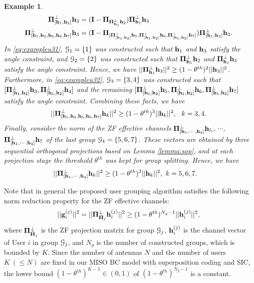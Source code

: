 \documentclass[11pt, draft, onecolumn ]{IEEEtran}
\newtheorem{example}{Example}
\begin{document}
\begin{example}
\begin{align}
{\bf \Pi}_{[{\bf h}_1,{\bf h}_2]}^\perp{\bf h}_3&=  ({\bf I} - {\bf \Pi}_{{\bf \Pi}^\perp_{{\bf h}_1}{\bf h}_2}) {\bf \Pi}_{{\bf h}_1}^\perp {\bf h}_3  \label{eq:exampleu31}\\
{\bf \Pi}_{[{\bf h}_1,{\bf h}_2,{\bf h}_5,{\bf h}_6,{\bf h}_7]}^\perp{\bf h}_3 &= ({\bf I} - {\bf \Pi}_{[{\bf \Pi}_{[{\bf h}_1,{\bf h}_2]}^\perp{\bf h}_5,{\bf \Pi}_{[{\bf h}_1,{\bf h}_2]}^\perp{\bf h}_6,{\bf \Pi}_{[{\bf h}_1,{\bf h}_2]}^\perp{\bf h}_7]}) {\bf \Pi}_{[{\bf h}_1,{\bf h}_2]}^\perp{\bf h}_3. \label{eq:exampleu32}
\end{align}
In \eqref{eq:exampleu31}, ${\cal G}_1=\{1\}$ was constructed such that ${\bf h}_1$ and ${\bf h}_3$ satisfy the angle constraint, and ${\cal G}_2=\{2\}$ was constructed such that  ${\bf \Pi}^\perp_{{\bf h}_1}{\bf h}_2$ and  ${\bf \Pi}_{{\bf h}_1}^\perp {\bf h}_3$ satisfy the angle constraint. Hence,   we have $||{\bf \Pi}_{{\bf h}_1}^\perp {\bf h}_3||^2 \ge (1-\theta^{th})^2 ||{\bf h}_3||^2$. Furthermore, in \eqref{eq:exampleu32}, ${\cal G}_3=\{3,4\}$ was constructed such that
$[{\bf \Pi}_{[{\bf h}_1,{\bf h}_2]}^\perp{\bf h}_3,{\bf \Pi}_{[{\bf h}_1,{\bf h}_2]}^\perp{\bf h}_4]$ and the remaining $[{\bf \Pi}_{[{\bf h}_1,{\bf h}_2]}^\perp{\bf h}_5,{\bf \Pi}_{[{\bf h}_1,{\bf h}_2]}^\perp{\bf h}_6,{\bf \Pi}_{[{\bf h}_1,{\bf h}_2]}^\perp{\bf h}_7]$ satisfy the angle constraint. Combining these facts, we have
\begin{equation}
||{\bf \Pi}_{[{\bf h}_1,{\bf h}_2,{\bf h}_5,{\bf h}_6,{\bf h}_7]}^\perp{\bf h}_k||^2 \ge (1-\theta^{th})^3||{\bf h}_k||^2, ~~k=3,4.
\end{equation}
Finally, consider the norm of the ZF effective channels ${\bf \Pi}_{[{\bf h}_1,\cdots,{\bf h}_4]}^\perp {\bf h}_5$, $\cdots$, ${\bf \Pi}_{[{\bf h}_1,\cdots,{\bf h}_4]}^\perp {\bf h}_7$ of the last group ${\cal G}_4=\{5,6,7\}$. These vectors are obtained by three sequential orthogonal projections based on Lemma  \ref{lemma:sop}, and at each projection stage the threshold $\theta^{th}$ was kept for group splitting. Hence, we have
\begin{align*}
||{\bf \Pi}_{[{\bf h}_1,\cdots,{\bf h}_4]}^\perp {\bf h}_k||^2 &\ge(1- \theta^{th})^3||{\bf h}_k||^2, ~k=5,6,7.
\end{align*}
\end{example}
Note that in general the proposed user grouping algorithm satisfies the following norm reduction property for the ZF effective channels:
\begin{equation}
||{\bf g}_i^{(j)}||^2=||{\bf \Pi}_{\tilde{{\bf H}}_j}^\perp {\bf h}_i^{(j)}||^2 \ge (1-\theta^{th})^{N_g-1} ||{\bf h}_i^{(j)}||^2,
\end{equation}
where ${\bf \Pi}_{\tilde{{\bf H}}_j}^\perp$ is the ZF projection matrix for group ${\cal G}_j$, ${\bf h}_i^{(j)}$ is the channel vector of User $i$ in group ${\cal G}_j$, and $N_g$ is the number of constructed groups, which is bounded by $K$.  Since the number  of antennas $N$ and the number of users  $K ~(\le N)$  are fixed in  our MISO BC model with superposition coding and SIC,  the lower bound $(1-\theta^{th})^{K-1} \in (0,1)$ of $(1-\theta^{th})^{N_g-1}$ is a constant.
\end{document}
